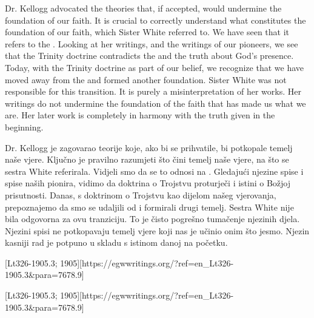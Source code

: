 Dr. Kellogg advocated the theories that, if accepted, would undermine the foundation of our faith. It is crucial to correctly understand what constitutes the foundation of our faith, which Sister White referred to. We have seen that it refers to the . Looking at her writings, and the writings of our pioneers, we see that the Trinity doctrine contradicts the  and the truth about God’s presence. Today, with the Trinity doctrine as part of our belief, we recognize that we have moved away from the  and formed another foundation. Sister White was not responsible for this transition. It is purely a misinterpretation of her works. Her writings do not undermine the foundation of the faith that has made us what we are. Her later work is completely in harmony with the truth given in the beginning.


Dr. Kellogg je zagovarao teorije koje, ako bi se prihvatile, bi potkopale temelj naše vjere. Ključno je pravilno razumjeti što čini temelj naše vjere, na što se sestra White referirala. Vidjeli smo da se to odnosi na . Gledajući njezine spise i spise naših pionira, vidimo da doktrina o Trojstvu proturječi  i istini o Božjoj prisutnosti. Danas, s doktrinom o Trojstvu kao dijelom našeg vjerovanja, prepoznajemo da smo se udaljili od  i formirali drugi temelj. Sestra White nije bila odgovorna za ovu tranziciju. To je čisto pogrešno tumačenje njezinih djela. Njezini spisi ne potkopavaju temelj vjere koji nas je učinio onim što jesmo. Njezin kasniji rad je potpuno u skladu s istinom danoj na početku.


[Lt326-1905.3; 1905][https://egwwritings.org/?ref=en\_Lt326-1905.3&para=7678.9]


[Lt326-1905.3; 1905][https://egwwritings.org/?ref=en\_Lt326-1905.3&para=7678.9]


